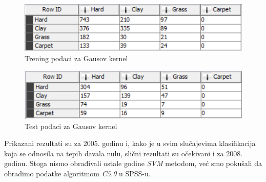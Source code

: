 \documentclass[a4paper]{article}
\begin{document}
\begin{figure}[h!]
	\begin{center}
		\includegraphics[scale=0.80]{KNIME_project/SVM/rbf_training}
	\end{center}
	\caption{Trening podaci za Gausov kernel}
	\label{fig:rbf_training}
\end{figure}

\begin{figure}[h!]
\begin{center}
	\includegraphics[scale=0.80]{KNIME_project/SVM/rbf_test}
\end{center}
\caption{Test podaci za Gausov kernel}
\label{fig:rbf_test}
\end{figure}

Prikazani rezultati su za 2005. godinu i, kako je u svim slučajevima klasifikacija koja se odnosila na tepih davala nulu, slični rezultati su očekivani i za 2008. godinu. Stoga nismo obrađivali ostale godine \textit{SVM} metodom, već smo pokušali da obradimo podatke algoritmom \textit{C5.0} u SPSS-u.
\end{document}
